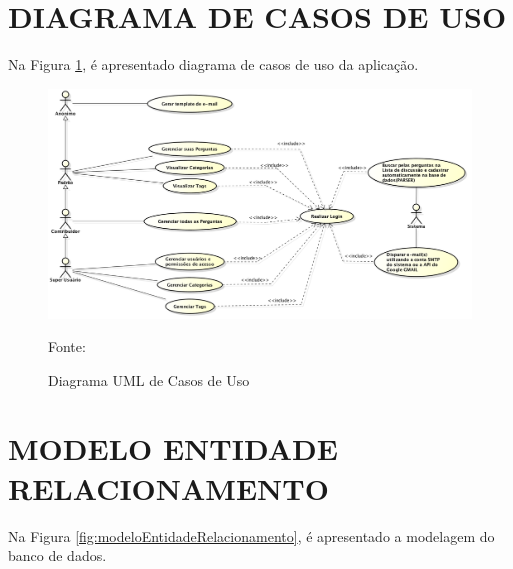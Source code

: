\section{DIAGRAMA DE CASOS DE USO}

Na Figura \ref{fig:diagramaCasosDeUso}, é apresentado diagrama de casos de uso
da aplicação.

\begin{figure}[h!tb]
	\caption{Diagrama UML de Casos de Uso}
	\label{fig:diagramaCasosDeUso}

	\centering
	\includegraphics[width=\textwidth]{images/usecase.png}

	\centering
	\footnotesize Fonte: \fonteOAutor
\end{figure}

\FloatBarrier 	%


\section{MODELO ENTIDADE RELACIONAMENTO}

Na Figura \ref{fig:modeloEntidadeRelacionamento}, é apresentado a modelagem do
banco de dados.

